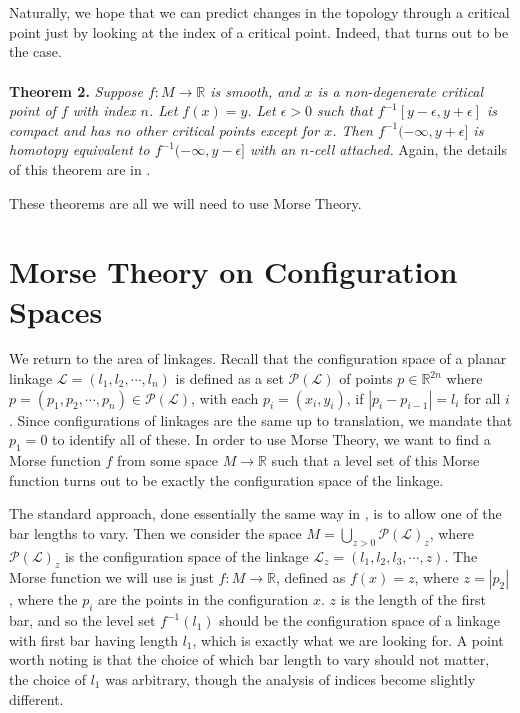 \documentclass{article}
\begin{document}
\\ \\
Naturally, we hope that we can predict changes in the topology through a critical point just by looking at the index of a critical point. Indeed, that turns out to be the case. \\ \\
\textbf{Theorem 2.} \emph{Suppose $f: M \to \mathbb{R}$ is smooth, and $x$ is a non-degenerate critical point of $f$ with index $n$. Let $f(x) = y$. Let $\epsilon > 0$ such that $f^{-1}[y - \epsilon, y + \epsilon]$ is compact and has no other critical points except for $x$. Then $f^{-1}(-\infty, y + \epsilon]$ is homotopy equivalent to $f^{-1}(-\infty, y - \epsilon]$ with an $n$-cell attached.}
Again, the details of this theorem are in \cite{milnor}. 

These theorems are all we will need to use Morse Theory.

\section{Morse Theory on Configuration Spaces}
We return to the area of linkages. Recall that the configuration space of a planar linkage $\mathcal{L} = (l_1, l_2, \cdots , l_n)$ is defined as a set $\mathcal{P(L)}$ of points $p \in \mathbb{R}^{2n}$ where $p = (p_1, p_2, \cdots, p_n) \in \mathcal{P(L)}$, with each $p_i = (x_i, y_i)$, if $|p_i - p_{i-1}| = l_i$ for all $i$. Since configurations of linkages are the same up to translation, we mandate that $p_1 = 0$ to identify all of these. In order to use Morse Theory, we want to find a Morse function $f$ from some space $M \to \mathbb{R}$ such that a level set of this Morse function turns out to be exactly the configuration space of the linkage.

The standard approach, done essentially the same way in \cite{planar}, is to allow one of the bar lengths to vary. Then we consider the space $M = \bigcup_{z>0} \mathcal{P(L)}_z$, where $\mathcal{P(L)}_z$ is the configuration space of the linkage $\mathcal{L}_z = (l_1, l_2, l_3, \cdots, z)$. The Morse function we will use is just $f: M \to \mathbb{R}$, defined as $f(x) = z$, where $z = |p_2|$, where the $p_i$ are the points in the configuration $x$. $z$ is the length of the first bar, and so the level set $f^{-1}(l_1)$ should be the configuration space of a linkage with first bar having length $l_1$, which is exactly what we are looking for. A point worth noting is that the choice of which bar length to vary should not matter, the choice of $l_1$ was arbitrary, though the analysis of indices become slightly different.
\end{document}
